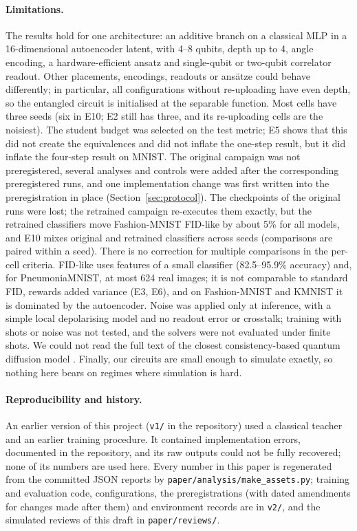 \documentclass[11pt]{article}
\newcommand{\fidlike}{FID-like}
\begin{document}
\paragraph{Limitations.} The results hold for one architecture: an additive
branch on a classical MLP in a 16-dimensional autoencoder latent, with 4--8
qubits, depth up to 4, angle encoding, a hardware-efficient ansatz and
single-qubit or two-qubit correlator readout. Other placements, encodings,
readouts or ans\"atze could behave differently; in particular, all configurations
without re-uploading have even depth, so the entangled circuit is initialised at the
separable function. Most cells have three seeds (six in
E10; E2 still has three, and its re-uploading cells are the noisiest). The student
budget was selected on the test metric; E5 shows that this did not create the
equivalences and did not inflate the one-step result, but it did inflate the
four-step result on MNIST. The original campaign was not preregistered, several
analyses and controls were added after the corresponding preregistered runs, and
one implementation change was first written into the preregistration in place
(Section~\ref{sec:protocol}). The checkpoints of the original runs were lost; the
retrained campaign re-executes them exactly, but the retrained classifiers move
Fashion-MNIST \fidlike{} by about 5\% for all models, and E10 mixes original and
retrained classifiers across seeds (comparisons are paired within a seed). There is
no correction for multiple comparisons in the per-cell criteria. \fidlike{} uses
features of a small classifier (82.5--95.9\% accuracy) and, for PneumoniaMNIST, at
most 624 real images; it is not comparable to standard FID, rewards added variance
(E3, E6), and on Fashion-MNIST and KMNIST it is dominated by the autoencoder. Noise
was applied only at inference, with a simple local depolarising model and no readout
error or crosstalk; training with shots or noise was not tested, and the solvers were
not evaluated under finite shots. We could not read the full text of the closest
consistency-based quantum diffusion model \citep{zhang2025oqiddm}. Finally, our
circuits are small enough to simulate exactly, so nothing here bears on regimes
where simulation is hard.

\paragraph{Reproducibility and history.} An earlier version of this project
(\texttt{v1/} in the repository) used a classical teacher and an earlier
training procedure. It contained implementation errors, documented in the
repository, and its raw outputs could not be fully recovered; none of its
numbers are used here. Every number in this paper is regenerated from the
committed JSON reports by \texttt{paper/analysis/make\_assets.py}; training and
evaluation code, configurations, the preregistrations (with dated amendments for
changes made after them) and environment records are in \texttt{v2/}, and the
simulated reviews of this draft in \texttt{paper/reviews/}.
\end{document}
